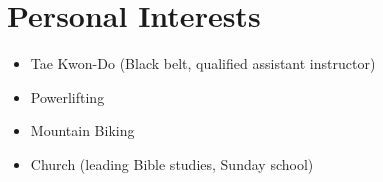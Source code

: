 \section*{Personal Interests}

\begin{itemize}
	\item Tae Kwon-Do (Black belt, qualified assistant instructor)
	\item Powerlifting
	\item Mountain Biking
	\item Church (leading Bible studies, Sunday school)
\end{itemize}
